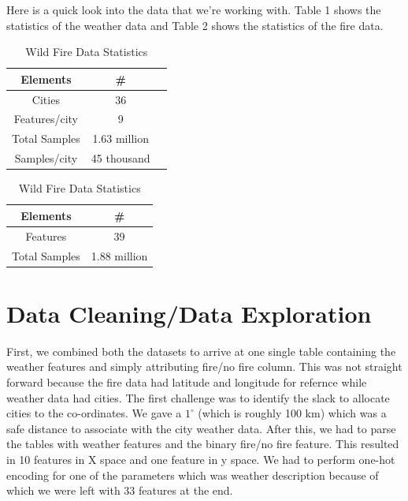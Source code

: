 \documentclass[10pt]{article}
\begin{document}
Here is a quick look into the data that we're working with. Table 1 shows the
statistics of the weather data and Table 2 shows the statistics of the fire
data.\par

\begin{table}[H]
    \centering
    \begin{minipage}[t]{0.45\textwidth}
        \caption{Weather Data Statistics}
        \centering
        \begin{tabular}{c c c}
            \hline
            Elements & \# \\ %
            \hline
                Cities & 36 \\
                Features/city & 9 \\
                Total Samples & 1.63 million \\
                Samples/city & 45 thousand 
                
        \end{tabular}
    \end{minipage}
    \begin{minipage}[t]{0.45\textwidth}
        \caption{Wild Fire Data Statistics}
        \centering
        \begin{tabular}{c c}
            \hline
            Elements & \# \\ %
            \hline
            Features &39\\
            Total Samples & 1.88 million\\
        \end{tabular}
    \end{minipage}
\end{table}
\section{Data Cleaning/Data Exploration}
First, we combined both the datasets to arrive at one single table containing
the weather features and simply attributing fire/no fire column. This was not
straight forward because the fire data had latitude and longitude for refernce
while weather data had cities. The first challenge was to identify the slack to
allocate cities to the co-ordinates. We gave a $1^\circ$ (which is roughly
100 km) which was a safe distance to associate with the city weather data.
After this, we had to parse the tables with weather features and the binary
fire/no fire feature. This resulted in 10 features in X space and one feature
in y space. We had to perform one-hot encoding for one of the parameters which
was weather description because of which we were left with 33 features at the
end.\par
\end{document}
